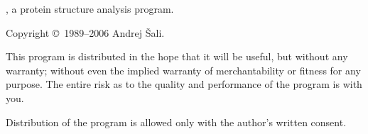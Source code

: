 \rule{0cm}{2cm}

\noindent \MDT, a protein structure analysis program.

\noindent Copyright \copyright\ 1989--2006 Andrej \v{S}ali.

\vspace{1cm}

\noindent This program is distributed in the hope that it will be
useful, but without any warranty; without even the implied warranty of
merchantability or fitness for any purpose. The entire risk
as to the quality and performance of the program is with you.

\noindent Distribution of the program is allowed only with the author's
written consent.

